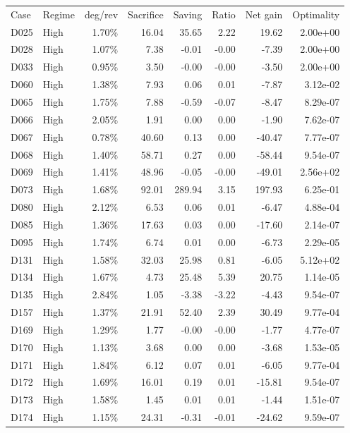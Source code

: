 \begin{tabular}{l l r r r r r r}
\hline\noalign{\smallskip}
Case & Regime & deg/rev & Sacrifice & Saving & Ratio & Net gain & Optimality \\
\noalign{\smallskip}\hline\noalign{\smallskip}
D025 & High & 1.70\% & 16.04 & 35.65 & 2.22 & 19.62 & 2.00e+00 \\
D028 & High & 1.07\% & 7.38 & -0.01 & -0.00 & -7.39 & 2.00e+00 \\
D033 & High & 0.95\% & 3.50 & -0.00 & -0.00 & -3.50 & 2.00e+00 \\
D060 & High & 1.38\% & 7.93 & 0.06 & 0.01 & -7.87 & 3.12e-02 \\
D065 & High & 1.75\% & 7.88 & -0.59 & -0.07 & -8.47 & 8.29e-07 \\
D066 & High & 2.05\% & 1.91 & 0.00 & 0.00 & -1.90 & 7.62e-07 \\
D067 & High & 0.78\% & 40.60 & 0.13 & 0.00 & -40.47 & 7.77e-07 \\
D068 & High & 1.40\% & 58.71 & 0.27 & 0.00 & -58.44 & 9.54e-07 \\
D069 & High & 1.41\% & 48.96 & -0.05 & -0.00 & -49.01 & 2.56e+02 \\
D073 & High & 1.68\% & 92.01 & 289.94 & 3.15 & 197.93 & 6.25e-01 \\
D080 & High & 2.12\% & 6.53 & 0.06 & 0.01 & -6.47 & 4.88e-04 \\
D085 & High & 1.36\% & 17.63 & 0.03 & 0.00 & -17.60 & 2.14e-07 \\
D095 & High & 1.74\% & 6.74 & 0.01 & 0.00 & -6.73 & 2.29e-05 \\
D131 & High & 1.58\% & 32.03 & 25.98 & 0.81 & -6.05 & 5.12e+02 \\
D134 & High & 1.67\% & 4.73 & 25.48 & 5.39 & 20.75 & 1.14e-05 \\
D135 & High & 2.84\% & 1.05 & -3.38 & -3.22 & -4.43 & 9.54e-07 \\
D157 & High & 1.37\% & 21.91 & 52.40 & 2.39 & 30.49 & 9.77e-04 \\
D169 & High & 1.29\% & 1.77 & -0.00 & -0.00 & -1.77 & 4.77e-07 \\
D170 & High & 1.13\% & 3.68 & 0.00 & 0.00 & -3.68 & 1.53e-05 \\
D171 & High & 1.84\% & 6.12 & 0.07 & 0.01 & -6.05 & 9.77e-04 \\
D172 & High & 1.69\% & 16.01 & 0.19 & 0.01 & -15.81 & 9.54e-07 \\
D173 & High & 1.58\% & 1.45 & 0.01 & 0.01 & -1.44 & 1.51e-07 \\
D174 & High & 1.15\% & 24.31 & -0.31 & -0.01 & -24.62 & 9.59e-07 \\

\end{tabular}
